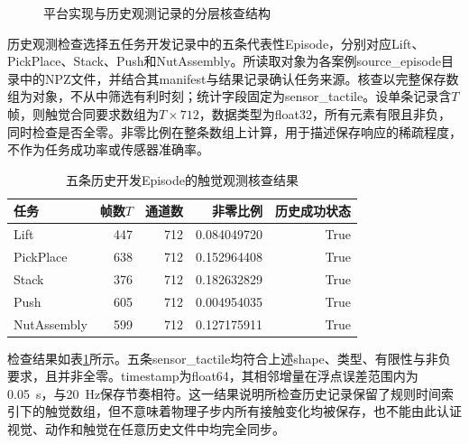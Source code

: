 \begin{figure}[htbp]
  \centering
  \caption{平台实现与历史观测记录的分层核查结构}
  \label{fig:ch02_validation}
\end{figure}

历史观测检查选择五任务开发记录中的五条代表性Episode，分别对应Lift、PickPlace、Stack、Push和NutAssembly。所读取对象为各案例source\_episode目录中的NPZ文件，并结合其manifest与结果记录确认任务来源。核查以完整保存数组为对象，不从中筛选有利时刻；统计字段固定为sensor\_tactile。设单条记录含$T$帧，则触觉合同要求数组为$T\times712$，数据类型为float32，所有元素有限且非负，同时检查是否全零。非零比例在整条数组上计算，用于描述保存响应的稀疏程度，不作为任务成功率或传感器准确率。

\begin{table}[htbp]
  \centering\small
  \caption{五条历史开发Episode的触觉观测核查结果}
  \label{tab:ch02_episode_validation}
  \begin{tabular}{lrrrr}
    \hline
    任务 & 帧数$T$ & 通道数 & 非零比例 & 历史成功状态\\
    \hline
    Lift & 447 & 712 & 0.084049720 & True\\
    PickPlace & 638 & 712 & 0.152964408 & True\\
    Stack & 376 & 712 & 0.182632829 & True\\
    Push & 605 & 712 & 0.004954035 & True\\
    NutAssembly & 599 & 712 & 0.127175911 & True\\
    \hline
  \end{tabular}
\end{table}

检查结果如表\ref{tab:ch02_episode_validation}所示。五条sensor\_tactile均符合上述shape、类型、有限性与非负要求，且并非全零。timestamp为float64，其相邻增量在浮点误差范围内为0.05~s，与20~Hz保存节奏相符。这一结果说明所检查历史记录保留了规则时间索引下的触觉数组，但不意味着物理子步内所有接触变化均被保存，也不能由此认证视觉、动作和触觉在任意历史文件中均完全同步。

